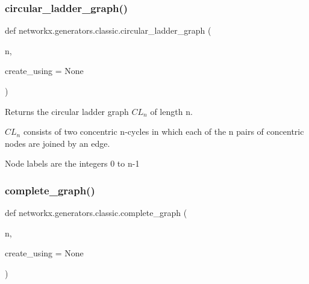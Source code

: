 \subsubsection{\texorpdfstring{circular\+\_\+ladder\+\_\+graph()}{circular\_ladder\_graph()}}
{\footnotesize\ttfamily def networkx.\+generators.\+classic.\+circular\+\_\+ladder\+\_\+graph (\begin{DoxyParamCaption}\item[{}]{n,  }\item[{}]{create\+\_\+using = {\ttfamily None} }\end{DoxyParamCaption})}

\begin{DoxyVerb}Returns the circular ladder graph $CL_n$ of length n.

$CL_n$ consists of two concentric n-cycles in which
each of the n pairs of concentric nodes are joined by an edge.

Node labels are the integers 0 to n-1\end{DoxyVerb}
 \mbox{\label{namespacenetworkx_1_1generators_1_1classic_adc64fea09115f5630c489d951d14f7eb}} 
\subsubsection{\texorpdfstring{complete\+\_\+graph()}{complete\_graph()}}
{\footnotesize\ttfamily def networkx.\+generators.\+classic.\+complete\+\_\+graph (\begin{DoxyParamCaption}\item[{}]{n,  }\item[{}]{create\+\_\+using = {\ttfamily None} }\end{DoxyParamCaption})}

